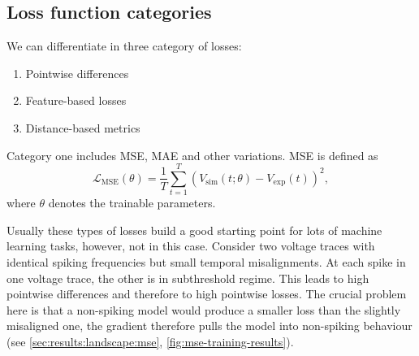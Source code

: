 \subsection{Loss function categories}\label{sec:bg:loss:categories}
We can differentiate in three category of losses:
\begin{enumerate}
  \item Pointwise differences
  \item Feature-based losses
  \item Distance-based metrics
\end{enumerate}
Category one includes \gls{MSE}, \gls{MAE} and other variations.
\gls{MSE} is defined as
\begin{equation}\label{eq:MSE}
    \mathcal{L}_{\text{MSE}}(\theta) = \frac{1}{T} \sum_{t=1}^{T} \left( V_{\text{sim}}(t; \theta) - V_{\text{exp}}(t) \right)^2,
\end{equation}
where $\theta$ denotes the trainable parameters.

Usually these types of losses build a good starting point for lots of machine learning tasks, however, not in this case.
Consider two voltage traces with identical spiking frequencies but small temporal misalignments.
At each spike in one voltage trace, the other is in subthreshold regime.
This leads to high pointwise differences and therefore to high pointwise losses.
The crucial problem here is that a non-spiking model would produce a smaller loss than the slightly misaligned one,
the gradient therefore pulls the model into non-spiking behaviour (see \cref{sec:results:landscape:mse}, \cref{fig:mse-training-results}).

